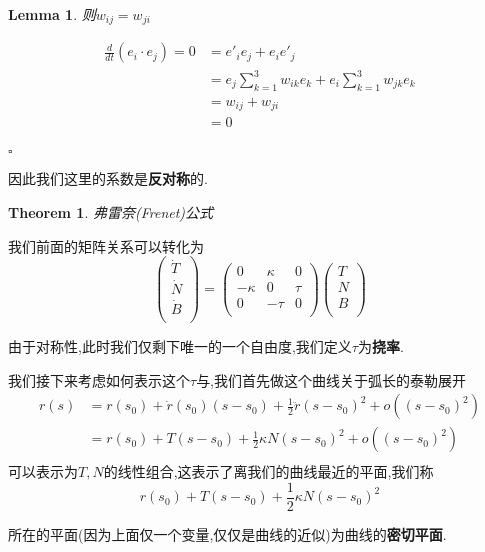 \documentclass[11pt,hyperref,a4paper,UTF8]{ctexart}
\newtheorem{theorem}{Theorem}[subsection]
\newtheorem{lemma}{Lemma}[subsection]
\newenvironment{cproof}{%
\heiti{证明}\kaishu
}{%
  \hfill $\square$
  \par\bigskip
}
\begin{document}
\begin{CJK}{UTF8}{gkai}
\begin{lemma}
  则$w_{ij} = w_{ji}$
\end{lemma}


\begin{cproof}
  \[
  \begin{aligned}  
    \frac{d}{dt}(e_i\cdot e_j) = 0 &= e'_i e_j + e_i e'_j\\
    &= e_j \sum_{k = 1}^{3}w_{ik} e_k + e_i \sum_{k = 1}^{3}w_{jk}e_{k}\\
    &= w_{ij} + w_{ji}\\
    &= 0\\
  \end{aligned}  
  \]

\end{cproof}
  
因此我们这里的系数是\textbf{反对称}的.

\begin{theorem}
  弗雷奈(Frenet)公式
\end{theorem}
我们前面的矩阵关系可以转化为
\[\begin{pmatrix}
  \dot{T}\\
  \dot{N}\\
  \dot{B}\\
\end{pmatrix}
=
\begin{pmatrix}
  0&\kappa&0\\
  -\kappa&0&\tau\\
  0&-\tau&0\\
\end{pmatrix}
\begin{pmatrix}
  T\\
  N\\
  B\\
\end{pmatrix}
\]

由于对称性,此时我们仅剩下唯一的一个自由度,我们定义$\tau$为\textbf{挠率}.

我们接下来考虑如何表示这个$\tau$与,我们首先做这个曲线关于弧长的泰勒展开
\[
\begin{aligned}
  r(s) &= r(s_0) + \dot{r}(s_0)(s - s_0) + \frac{1}{2}\ddot{r}(s - s_0)^2 + o((s - s_0)^2)\\
  &= r(s_0) + T(s - s_0) + \frac{1}{2}\kappa N (s - s_0)^2 + o((s - s_0)^2)\\
\end{aligned}  
\]
可以表示为$T,N$的线性组合,这表示了离我们的曲线最近的平面,我们称
\[r(s_0) + T(s - s_0) + \frac{1}{2}\kappa N (s - s_0)^2\]

所在的平面(因为上面仅一个变量,仅仅是曲线的近似)为曲线的\textbf{密切平面}.\\


\end{CJK}
\end{document}
